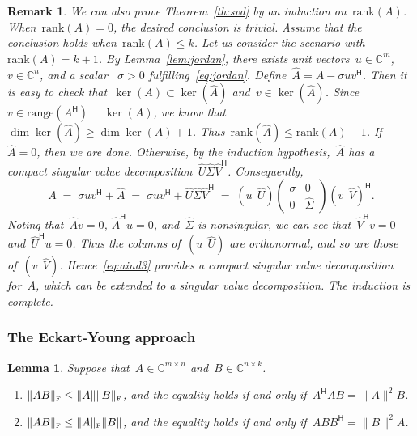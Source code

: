 \documentclass[11pt,a4paper]{article}
\newtheorem{lemma}{Lemma}%
\newtheorem{remark}{Remark}%
\theoremstyle{definition}
\def\CC{\mathbb{C}}
\newcommand{\fro}{{\scriptscriptstyle{\textnormal{F}}}}
\newcommand{\hmt}{{\scriptscriptstyle{{\mathsf{H}}}}}
\newcommand{\rank}{\mathrm{rank}}
\newcommand{\range}{\mathrm{range}}
\begin{document}
\begin{remark}
  We can also prove Theorem~\ref{th:svd} by an induction on~$\rank(A)$. When~$\rank(A) = 0$, 
  the desired conclusion is trivial. Assume that the conclusion holds when~$\rank(A) \le k$. Let us consider
  the scenario with~$\rank(A) = k+1$. By Lemma~\ref{lem:jordan}, there exists unit
  vectors~$u\in\CC^{m}$, $v\in\CC^{n}$, and a scalar ~$\sigma>0$ fulfilling~\eqref{eq:jordan}.
  Define~$\hat{A} = A-\sigma uv^\hmt$. Then it is easy to check that~$\ker(A)\subset
  \ker(\hat{A})$ and~$v\in\ker(\hat{A})$. Since~$v\in\range(A^\hmt)\perp \ker(A)$, we know
  that~$\dim\ker(\hat{A})\ge \dim\ker(A)+1$. Thus~$\rank(\hat{A}) \le \rank(A)-1$.
  If~$\hat{A} = 0$, then we are done. Otherwise, by the induction
  hypothesis,~$\hat{A}$ has a compact singular value decomposition~$\hat{U}\hat{\Sigma}\hat{V}^\hmt$. 
  Consequently, 
  \begin{equation}
    \label{eq:aind3}
    A\;=\; \sigma uv^\hmt + \hat{A} \;=\;
    \sigma uv^\hmt + \hat{U}\hat{\Sigma} \hat{V}^\hmt \;=\;
      (u\,\; \hat{U}) 
    \begin{pmatrix}
      \sigma & 0\\
      0 &\hat{\Sigma} 
    \end{pmatrix}
    (v\,\; \hat{V})^\hmt.
  \end{equation}
  Noting that~$\hat{A}v = 0$, $\hat{A}^\hmt u = 0$, and~$\hat{\Sigma}$ is nonsingular, we can see
  that~$\hat{V}^\hmt v = 0$ and~$\hat{U}^\hmt u  = 0$. Thus the columns of~$(u\,\;\hat{U})$ are
  orthonormal, and so are those of~$(v\,\; \hat{V})$. Hence~\eqref{eq:aind3} provides a compact
  singular value decomposition for~$A$, which can be extended to a singular value decomposition. The
  induction is complete. 
\end{remark}


\subsubsection{The Eckart-Young approach~\cite{Eckart_Young_1939}}

\begin{lemma}
  \label{lem:fro2}
  Suppose that~$A \in \CC^{m\times n}$ and~$B \in \CC^{n\times k}$.
  \begin{enumerate}[leftmargin=1.5em]
    \item $\|AB\|_\fro \le \|A\| \|B\|_\fro$, and the equality holds if and only if~$A^\hmt A B = \|A\|^2 B$. 
    \item $\|AB\|_\fro \le \|A\|_\fro\|B\|$, and the equality holds if and only if~$ABB^\hmt = \|B\|^2 A$.
  \end{enumerate}
\end{lemma}
\end{document}
